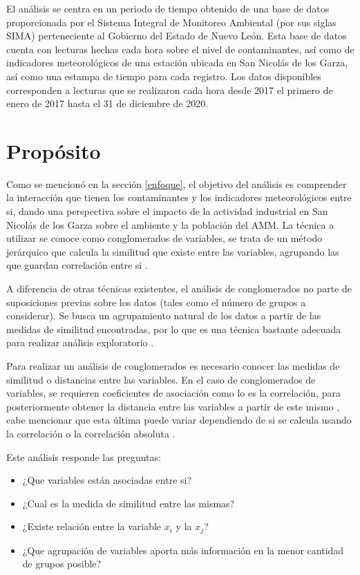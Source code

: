 \documentclass[journal, 10pt]{IEEEtran}                                                          %
\begin{document}
El análisis se centra en un periodo de tiempo obtenido de una base de datos proporcionada por el Sistema Integral de Monitoreo Ambiental (por sus siglas SIMA) perteneciente al Gobierno del Estado de Nuevo León. Esta base de datos cuenta con lecturas hechas cada hora sobre el nivel de contaminantes, así como de indicadores meteorológicos de una estación ubicada en San Nicolás de los Garza, así como una estampa de tiempo para cada registro. Los datos disponibles corresponden a lecturas que se realizaron cada hora desde 2017 el primero de enero de 2017 hasta el 31 de diciembre de 2020.  




\section{Propósito} \label{proposito}

Como se mencionó en la sección \ref{enfoque}, el objetivo del análisis es comprender la interacción que tienen los contaminantes y los indicadores meteorológicos entre si, dando una perspectiva sobre el impacto de la actividad industrial en San Nicolás de los Garza sobre el ambiente y la población del AMM. La técnica a utilizar se conoce como conglomerados de variables, se trata de un método jerárquico que calcula la similitud que existe entre las variables, agrupando las que guardan correlación entre si \cite{appliedMulti}.   

A diferencia de otras técnicas existentes, el análisis de conglomerados no parte de suposiciones previas sobre los datos (tales como el número de grupos a considerar). Se busca un agrupamiento natural de los datos a partir de las medidas de similitud encontradas, por lo que es una técnica bastante adecuada para realizar análisis exploratorio \cite{appliedMulti}. 

Para realizar un análisis de conglomerados es necesario conocer las medidas de similitud o distancias entre las variables. En el caso de conglomerados de variables, se requieren coeficientes de asociación como lo es la correlación, para posteriormente obtener la distancia entre las variables a partir de este mismo , cabe mencionar que esta última puede variar dependiendo de si se calcula usando la correlación o la correlación absoluta \cite{minitab_n.d.}.

Este análisis responde las preguntas: \begin{itemize}
    \item ¿Que variables están asociadas entre si?
    \item ¿Cual es la medida de similitud entre las mismas?
    \item  ¿Existe relación entre la variable $x_i$ y la $x_j$? 
    \item ¿Que agrupación de variables aporta más información en la menor cantidad de grupos posible?
\end{itemize}
\end{document}
